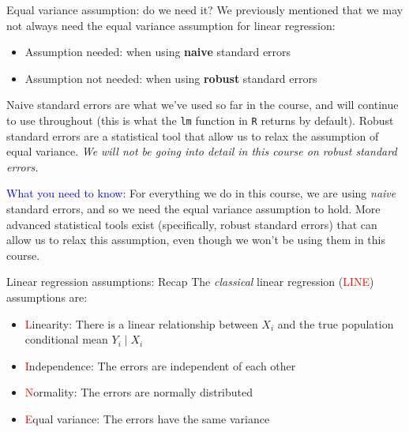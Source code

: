 \documentclass[10pt,t]{beamer}
\begin{document}
\begin{frame}{Equal variance assumption: do we need it?}
We previously mentioned that we may not always need the equal variance assumption for linear regression:

\vspace{0.3cm}

\begin{itemize}
	\item Assumption needed: when using \textbf{naive} standard errors 
	\item Assumption not needed: when using \textbf{robust} standard errors
\end{itemize}

\vspace{0.3cm}

Naive standard errors are what we've used so far in the course, and will continue to use throughout (this is what the \texttt{lm} function in \texttt{R} returns by default). Robust standard errors are a statistical tool that allow us to relax the assumption of equal variance. \textit{We will not be going into detail in this course on robust standard errors.}

\vspace{0.3cm}

\small \textcolor{blue}{What you need to know:} For everything we do in this course, we are using \textit{naive} standard errors, and so we need the equal variance assumption to hold. More advanced statistical tools exist (specifically, robust standard errors) that can allow us to relax this assumption, even though we won't be using them in this course.

\end{frame}

\begin{frame}{Linear regression assumptions: Recap}
The \textit{classical} linear regression (\textcolor{red}{LINE}) assumptions are:

\vspace{0.3cm}

\begin{itemize}
	\item \textcolor{red}{L}inearity: There is a linear relationship between $X_i$ and the true population conditional mean $Y_i \mid X_i$
	\item \textcolor{red}{I}ndependence: The errors are independent of each other
	\item \textcolor{red}{N}ormality: The errors are normally distributed
	\item \textcolor{red}{E}qual variance: The errors have the same variance
\end{itemize}


\end{frame}
\end{document}
